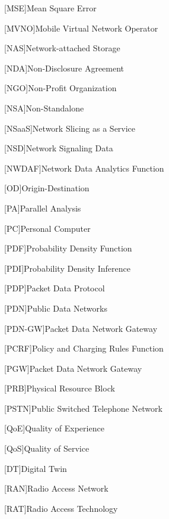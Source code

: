 \begin{acronym}[]
[MSE]{Mean Square Error}  

[MVNO]{Mobile Virtual Network Operator}

[NAS]{Network-attached Storage}

[NDA]{Non-Disclosure Agreement}

[NGO]{Non-Profit Organization}

[NSA]{Non-Standalone}

[NSaaS]{Network Slicing as a Service}

[NSD]{Network Signaling Data}

[NWDAF]{Network Data Analytics Function}

[OD]{Origin-Destination}

[PA]{Parallel Analysis}

[PC]{Personal Computer}

[PDF]{Probability Density Function}

[PDI]{Probability Density Inference}

[PDP]{Packet Data Protocol}

[PDN]{Public Data Networks}

[PDN-GW]{Packet Data Network Gateway}

[PCRF]{Policy and Charging Rules Function}

[PGW]{Packet Data Network Gateway}

[PRB]{Physical Resource Block}

[PSTN]{Public Switched Telephone Network}

[QoE]{Quality of Experience}

[QoS]{Quality of Service}

[DT]{Digital Twin}

[RAN]{Radio Access Network}

[RAT]{Radio Access Technology}


\end{acronym}
